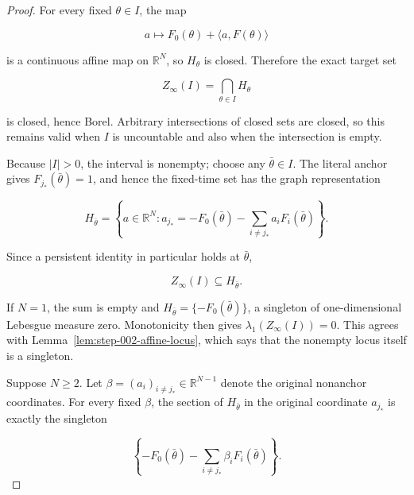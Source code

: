 \begin{proof}
For every fixed \(\theta\in I\), the map

\begin{equation}
\label{eq:appendix-display-042}
a\longmapsto F_0(\theta)+\langle a,F(\theta)\rangle
\end{equation}

is a continuous affine map on \(\mathbb R^N\), so \(H_\theta\) is closed. Therefore the exact target set

\begin{equation}
\label{eq:appendix-display-043}
Z_\infty(I)=\bigcap_{\theta\in I}H_\theta
\end{equation}

is closed, hence Borel. Arbitrary intersections of closed sets are closed, so this remains valid when \(I\) is
uncountable and also when the intersection is empty.

Because \(\lvert I\rvert>0\), the interval is nonempty; choose any \(\bar\theta\in I\). The literal
anchor gives \(F_{j_*}(\bar\theta)=1\), and hence the fixed-time set has the graph representation

\begin{equation}
\label{eq:appendix-display-044}
H_{\bar\theta}
=\left\{a\in\mathbb R^N:
a_{j_*}
=-F_0(\bar\theta)
-\sum_{i\neq j_*}a_iF_i(\bar\theta)\right\}.
\end{equation}

Since a persistent identity in particular holds at \(\bar\theta\),

\begin{equation}
\label{eq:appendix-display-045}
Z_\infty(I)\subseteq H_{\bar\theta}.
\end{equation}

If \(N=1\), the sum is empty and
\(H_{\bar\theta}=\{-F_0(\bar\theta)\}\), a singleton of one-dimensional Lebesgue measure zero. Monotonicity
then gives \(\lambda_1(Z_\infty(I))=0\). This agrees with
Lemma~\ref{lem:step-002-affine-locus}, which says that the nonempty locus itself is a singleton.

Suppose \(N\geq2\). Let
\(\beta=(a_i)_{i\neq j_*}\in\mathbb R^{N-1}\) denote the original nonanchor coordinates. For every fixed
\(\beta\), the section of \(H_{\bar\theta}\) in the original coordinate \(a_{j_*}\) is exactly the singleton

\begin{equation}
\label{eq:appendix-display-046}
\left\{
-F_0(\bar\theta)-\sum_{i\neq j_*}\beta_iF_i(\bar\theta)
\right\}.
\end{equation}


\end{proof}
